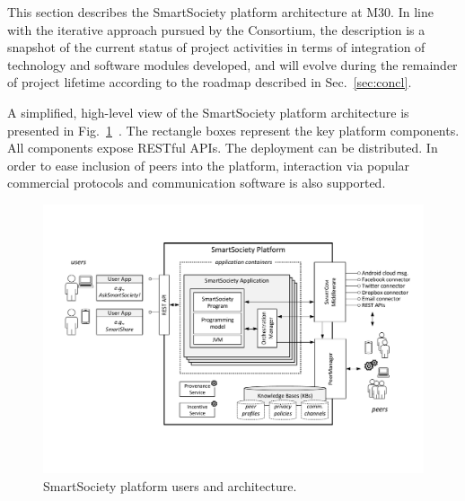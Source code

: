 This section describes the SmartSociety platform architecture at M30. In line with the iterative approach pursued by the Consortium, the description is a snapshot of the current status of project activities in terms of integration of technology and software modules developed, and will evolve during the remainder of project lifetime according to the roadmap described in Sec.~\ref{sec:concl}.

A simplified, high-level view of the SmartSociety platform architecture is presented in Fig.~\ref{fig:architecture}~\cite{scekic_soca2015}. 
The rectangle boxes represent the key platform components. All components expose RESTful APIs. The deployment can be distributed. 
In order to ease inclusion of peers into the platform, interaction via popular commercial protocols and communication software is also supported.

\begin{figure}[t]
 \centering
 \includegraphics[width=0.8\linewidth]{figs/platform-architecture}
 \caption{SmartSociety platform users and architecture.}
 \label{fig:architecture}
\end{figure}

